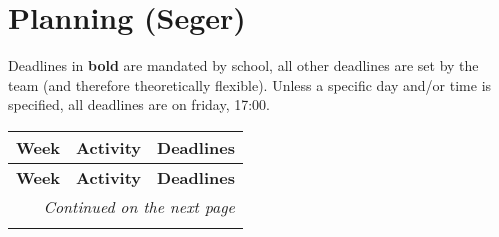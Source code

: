 \documentclass{article}
\begin{document}
\section{Planning (Seger)}
Deadlines in \textbf{bold} are mandated by school, all other deadlines are set by the team (and therefore theoretically flexible).
Unless a specific day and/or time is specified, all deadlines are on friday, 17:00.
\begin{longtable}{|l|p{}|p{}|}
    \hline
    \textbf{Week} & \textbf{Activity}                         & \textbf{Deadlines}                      \\ \hline
    \endfirsthead

    \hline
    \textbf{Week} & \textbf{Activity}                         & \textbf{Deadlines}                      \\ \hline
    \endhead

    \hline \multicolumn{3}{r}{\textit{Continued on the next page}}                                             \\ \hline
    \endfoot

    \hline
    \endlastfoot


\end{longtable}
\end{document}
